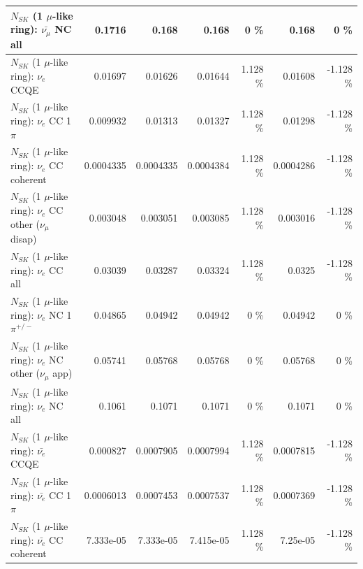 \begin{table}
\begin{tabular}{| l | r | r | r  r | r  r |}
                          $N_{SK}$ (1 $\mu$-like ring): $\bar{\nu_{\mu}}$ NC all &          0.1716 &           0.168 &           0.168 &        0 \%  &           0.168 &        0 \%  \\ 
\hline
\hline
\hline
                                      $N_{SK}$ (1 $\mu$-like ring): $\nu_e$ CCQE &         0.01697 &         0.01626 &         0.01644 &    1.128 \%  &         0.01608 &   -1.128 \%  \\ 
                                 $N_{SK}$ (1 $\mu$-like ring): $\nu_e$ CC 1$\pi$ &        0.009932 &         0.01313 &         0.01327 &    1.128 \%  &         0.01298 &   -1.128 \%  \\ 
                               $N_{SK}$ (1 $\mu$-like ring): $\nu_e$ CC coherent &       0.0004335 &       0.0004335 &       0.0004384 &    1.128 \%  &       0.0004286 &   -1.128 \%  \\ 
                $N_{SK}$ (1 $\mu$-like ring): $\nu_e$ CC other ($\nu_\mu$ disap) &        0.003048 &        0.003051 &        0.003085 &    1.128 \%  &        0.003016 &   -1.128 \%  \\ 
                                  $N_{SK}$ (1 $\mu$-like ring): $\nu_{e}$ CC all &         0.03039 &         0.03287 &         0.03324 &    1.128 \%  &          0.0325 &   -1.128 \%  \\ 
\hline
                           $N_{SK}$ (1 $\mu$-like ring): $\nu_e$ NC 1$\pi^{+/-}$ &         0.04865 &         0.04942 &         0.04942 &        0 \%  &         0.04942 &        0 \%  \\ 
                  $N_{SK}$ (1 $\mu$-like ring): $\nu_e$ NC other ($\nu_\mu$ app) &         0.05741 &         0.05768 &         0.05768 &        0 \%  &         0.05768 &        0 \%  \\ 
                                  $N_{SK}$ (1 $\mu$-like ring): $\nu_{e}$ NC all &          0.1061 &          0.1071 &          0.1071 &        0 \%  &          0.1071 &        0 \%  \\ 
\hline
\hline
\hline
                                $N_{SK}$ (1 $\mu$-like ring): $\bar{\nu_e}$ CCQE &        0.000827 &       0.0007905 &       0.0007994 &    1.128 \%  &       0.0007815 &   -1.128 \%  \\ 
                           $N_{SK}$ (1 $\mu$-like ring): $\bar{\nu_e}$ CC 1$\pi$ &       0.0006013 &       0.0007453 &       0.0007537 &    1.128 \%  &       0.0007369 &   -1.128 \%  \\ 
                         $N_{SK}$ (1 $\mu$-like ring): $\bar{\nu_e}$ CC coherent &       7.333e-05 &       7.333e-05 &       7.415e-05 &    1.128 \%  &        7.25e-05 &   -1.128 \%  \\ 

\end{tabular}
\end{table}
